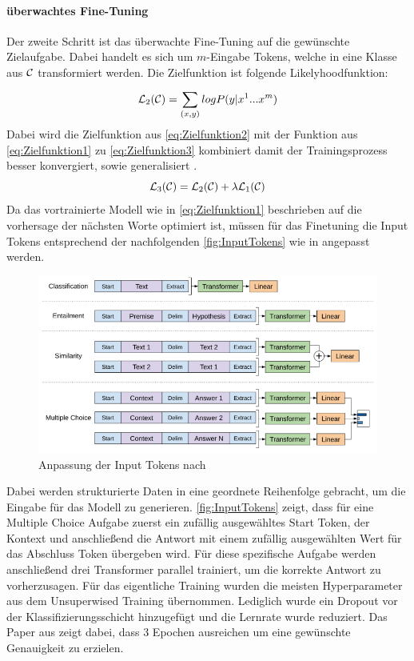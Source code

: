 \documentclass[conference]{IEEEtran}
\begin{document}
\paragraph{überwachtes Fine-Tuning}
Der zweite Schritt ist das überwachte Fine-Tuning auf die gewünschte Zielaufgabe. Dabei handelt es sich um $m$-Eingabe Tokens, welche in eine Klasse aus $\cal C$ transformiert werden. Die Zielfunktion ist folgende Likelyhoodfunktion:
\begin{equation}
    {\cal L}_2({\cal C}) = \sum_{(x,y)}^{} log P(y|x^1 ... x^m)
    \label{eq:Zielfunktion2}
\end{equation}
Dabei wird die Zielfunktion aus \autoref{eq:Zielfunktion2} mit der Funktion aus \autoref{eq:Zielfunktion1} zu \autoref{eq:Zielfunktion3} kombiniert damit der Trainingsprozess besser konvergiert, sowie generalisiert \cite{radfordImprovingLanguageUnderstanding}.
\begin{equation}
    {\cal L}_3({\cal C}) = {\cal L}_2({\cal C}) + \lambda {\cal L}_1({\cal C})
    \label{eq:Zielfunktion3}
\end{equation}
Da das vortrainierte Modell wie in \autoref{eq:Zielfunktion1} beschrieben auf die vorhersage der nächsten Worte optimiert ist, müssen für das Finetuning die Input Tokens entsprechend der nachfolgenden \autoref{fig:InputTokens} wie in \cite{radfordImprovingLanguageUnderstanding} angepasst werden.
\begin{figure}[htbp]
    \centerline{\includegraphics[width=\linewidth]{Bilder/TokenAnpassungGPT1.png}}
    \caption{Anpassung der Input Tokens nach \cite{radfordImprovingLanguageUnderstanding}}
\label{fig:InputTokens}
\end{figure}
Dabei werden strukturierte Daten in eine geordnete Reihenfolge gebracht, um die Eingabe für das Modell zu generieren. \autoref{fig:InputTokens} zeigt, dass für eine Multiple Choice Aufgabe zuerst ein zufällig ausgewähltes Start Token, der Kontext und anschließend die Antwort mit einem zufällig ausgewählten Wert für das Abschluss Token übergeben wird. Für diese spezifische Aufgabe werden anschließend drei Transformer parallel trainiert, um die korrekte Antwort zu vorherzusagen. Für das eigentliche Training wurden die meisten Hyperparameter aus dem Unsuperwised Training übernommen. Lediglich wurde ein Dropout vor der Klassifizierungsschicht hinzugefügt und die Lernrate wurde reduziert. Das Paper aus \cite{radfordImprovingLanguageUnderstanding} zeigt dabei, dass 3 Epochen ausreichen um eine gewünschte Genauigkeit zu erzielen.
\end{document}

